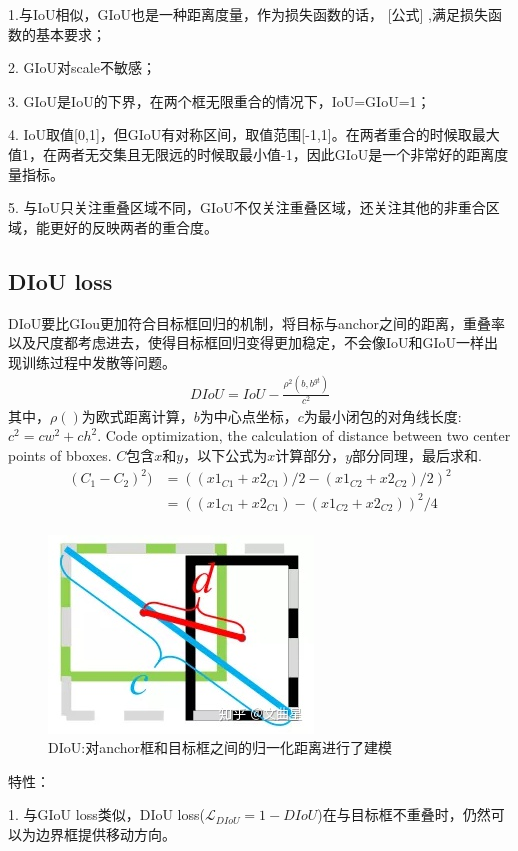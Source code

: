 \documentclass{article}
\begin{document}
1.与IoU相似，GIoU也是一种距离度量，作为损失函数的话， [公式] ,满足损失函数的基本要求；

2. GIoU对scale不敏感； 

3. GIoU是IoU的下界，在两个框无限重合的情况下，IoU=GIoU=1；

4. IoU取值[0,1]，但GIoU有对称区间，取值范围[-1,1]。在两者重合的时候取最大值1，在两者无交集且无限远的时候取最小值-1，因此GIoU是一个非常好的距离度量指标。

5. 与IoU只关注重叠区域不同，GIoU不仅关注重叠区域，还关注其他的非重合区域，能更好的反映两者的重合度。
\subsection{DIoU loss}
DIoU要比GIou更加符合目标框回归的机制，将目标与anchor之间的距离，重叠率以及尺度都考虑进去，使得目标框回归变得更加稳定，不会像IoU和GIoU一样出现训练过程中发散等问题。
\begin{align}
DIoU = IoU - 	\frac{\rho^2(b,b^{gt})}{c^2}
\end{align}
其中，$\rho()$为欧式距离计算，$b$为中心点坐标，$c$为最小闭包的对角线长度:$c^2= cw^2+ch^2$.
Code optimization, the calculation of distance between two center points of bboxes.
$C$包含$x$和$y$，以下公式为$x$计算部分，$y$部分同理，最后求和.
\begin{equation}
\begin{aligned}
(C_1-C_2)^2)&= ((x1_{C1}+x2_{C1})/2-(x1_{C2}+x2_{C2})/2)^2 \\
&=((x1_{C1}+x2_{C1})-(x1_{C2}+x2_{C2}))^2/4 \\
\end{aligned}
\end{equation}
\begin{figure}[htp]
\centering
\includegraphics[scale=0.5]{images/DIoU.jpg}
\caption{DIoU:对anchor框和目标框之间的归一化距离进行了建模}
\label{Fig. DIoU}
\end{figure}
特性：

1. 与GIoU loss类似，DIoU loss($ \mathcal{L}_{DIoU}= 1- DIoU$)在与目标框不重叠时，仍然可以为边界框提供移动方向。
\end{document}
